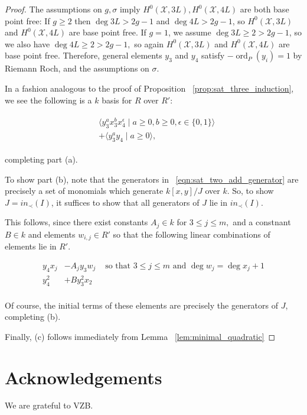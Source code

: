 \documentclass{amsart}
\theoremstyle{plain}
\theoremstyle{definition}
\theoremstyle{remark}
\numberwithin{equation}{section}
\newcommand \sx{\mathscr X}
\DeclareMathOperator{\ord}{ord}
\begin{document}
\begin{proof}
The assumptions on $g,\sigma$ imply $H^0(\sx, 3L), H^0(\sx, 4L)$ are both base point free: If $g \geq 2$ then $\deg 3L > 2g-1$ and $\deg 4L > 2g-1$, so $H^0(\sx, 3L)$ and $H^0(\sx, 4L)$ are base point free. If $g = 1$, we assume $\deg 3L \geq 2 > 2g-1$, so we also have $\deg 4L \geq 2 > 2g -1,$ so again $H^0(\sx, 3L)$ and $H^0(\sx, 4L)$ are base point free. Therefore, general elements $y_3$ and $y_4$ satisfy $-\ord
_P(y_i) = 1$ by Riemann Roch, and the assumptions on $\sigma$.  

In a fashion analogous to the proof of Proposition 
~\ref{prop:sat_three_induction}, we see 
the following is a $k$ basis for $R$ over $R'$:

\begin{align}
\label{eqn:sat_two_add_generator}
	\begin{split}
		&\langle y_3^ax_3^b x_4^\epsilon \mid a \geq 0, b 
		\geq 0, \epsilon \in \{0, 1\}\rangle \\
		&+\langle y_3^ay_4 \mid a \geq 0 \rangle,
	\end{split}
\end{align}

\noindent completing part (a).

To show part (b), note that the generators in
~\ref{eqn:sat_two_add_generator} are precisely a set of monomials which
generate $k[x,y]/J$ over $k$. So, to show $J = in_\prec(I)$, it
suffices to show that all generators of $J$ lie in $in_\prec(I)$.

This follows, since there exist constants $A_j \in k$ for $3 \leq j \leq m,$ and a constnant $B \in k$ and
elements $w_{i,j} \in R'$ so that the following linear combinations
of elements lie in $R'$.

\begin{align*}
	y_4x_j &- A_j y_3 w_j & \text{ so that } 3 \leq j \leq m \text{ and } \deg w_j = \deg x_j + 1\\
	y_4^2 &+ B y_3^2 x_2 \\
\end{align*}

\noindent
Of course, the initial terms of these elements are precisely the
generators of $J$, completing (b).

Finally, (c) follows immediately from Lemma ~\ref{lem:minimal_quadratic}
\end{proof}


\section{Acknowledgements}
We are grateful to VZB.

\nocite{*}
{}

\end{document}
